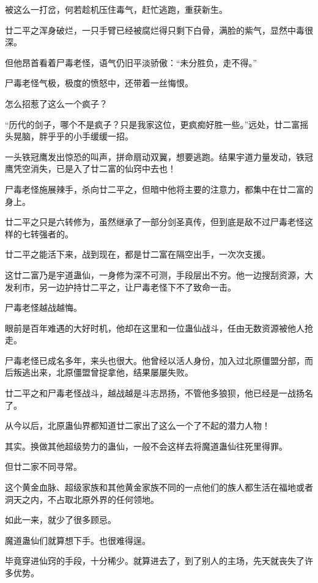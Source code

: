 
\begin{this_body}

被这么一打岔，何若趁机压住毒气，赶忙逃跑，重获新生。

廿二平之浑身破烂，一只手臂已经被腐烂得只剩下白骨，满脸的紫气，显然中毒很深。

但他昂首看着尸毒老怪，语气仍旧平淡骄傲：“未分胜负，走不得。”

尸毒老怪气极，极度的愤怒中，还带着一丝悔恨。

怎么招惹了这么一个疯子？

“历代的剑子，哪个不是疯子？只是我家这位，更疯痴好胜一些。”远处，廿二富摇头晃脑，胖乎乎的小手缓缓一招。

一头铁冠鹰发出惊恐的叫声，拼命扇动双翼，想要逃跑。结果宇道力量发动，铁冠鹰凭空消失，已是入了廿二富的仙窍中去也！

尸毒老怪施展辣手，杀向廿二平之，但暗中他将主要的注意力，都集中在廿二富的身上。

廿二平之只是六转修为，虽然继承了一部分剑圣真传，但到底是敌不过尸毒老怪这样的七转强者的。

廿二平之能活下来，战到现在，都是廿二富在隔空出手，一次次支援。

这廿二富乃是宇道蛊仙，一身修为深不可测，手段层出不穷。他一边搜刮资源，大发利市，另一边护持廿二平之，让尸毒老怪下不了致命一击。

尸毒老怪越战越悔。

眼前是百年难遇的大好时机，他却在这里和一位蛊仙战斗，任由无数资源被他人抢走。

尸毒老怪已成名多年，来头也很大。他曾经以活人身份，加入过北原僵盟分部，而后叛逃出来，北原僵盟曾捉拿他，结果屡屡失败。

廿二平之和尸毒老怪战斗，越战越是斗志昂扬，不管他多狼狈，他已经是一战扬名了。

从今以后，北原蛊仙界都知道廿二家出了这么一个了不起的潜力人物！

其实。换做其他超级势力的蛊仙，一般不会这样去将魔道蛊仙往死里得罪。

但廿二家不同寻常。

这个黄金血脉、超级家族和其他黄金家族不同的一点他们的族人都生活在福地或者洞天之内，不占取北原外界的任何领地。

如此一来，就少了很多顾忌。

魔道蛊仙们就算想下手。也很难得逞。

毕竟穿进仙窍的手段，十分稀少。就算进去了，到了别人的主场，先天就丧失了许多优势。


\end{this_body}
